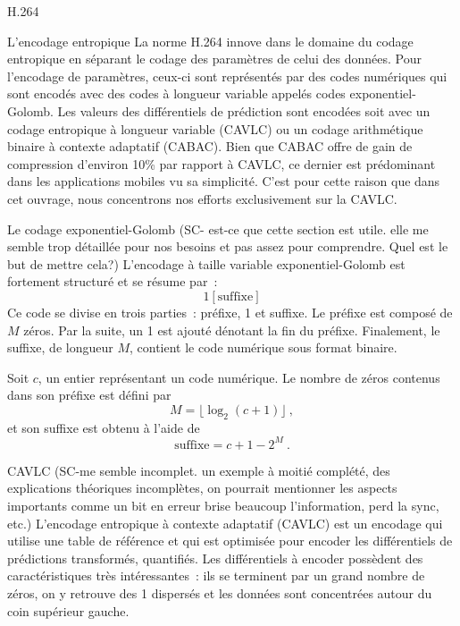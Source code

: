 \documentclass{article}
\begin{document}
\begin{section}{H.264}
\begin{subsection}{L'encodage entropique}
La norme H.264 innove dans le domaine du codage entropique en séparant le codage
des paramètres de celui des données. Pour l'encodage de paramètres, ceux-ci sont
représentés par des codes numériques qui sont encodés avec des codes à longueur
variable appelés codes exponentiel-Golomb. Les valeurs des différentiels de
prédiction sont encodées soit avec un codage entropique à longueur variable
(CAVLC) ou un codage arithmétique binaire à contexte adaptatif (CABAC). Bien que
CABAC offre de gain de compression d'environ 10\% par rapport à CAVLC, ce
dernier est prédominant dans les applications mobiles vu sa simplicité. C'est
pour cette raison que dans cet ouvrage, nous concentrons nos efforts
exclusivement sur la CAVLC.

\begin{subsubsection}{Le codage exponentiel-Golomb} (SC- est-ce que cette section est utile. elle me semble trop détaillée pour nos besoins et pas assez pour comprendre. Quel est le but de mettre cela?)
L'encodage à taille variable exponentiel-Golomb est fortement structuré et
se résume par~:
\begin{equation}
[M~\text{zéros}]1[\text{suffixe}]
\end{equation}
Ce code se divise en trois parties~: préfixe, 1 et suffixe. Le préfixe
est composé de $M$ zéros. Par la suite, un 1 est ajouté dénotant la fin du
préfixe. Finalement, le suffixe, de longueur $M$, contient le code numérique
sous format binaire.

Soit $c$, un entier représentant un code numérique. Le nombre de zéros contenus
dans son préfixe est défini par
\begin{equation}
M = \lfloor \log_2(c+1) \rfloor \:,
\end{equation}
et son suffixe est obtenu à l'aide de 
\begin{equation}
\text{suffixe} = c + 1 - 2^M \:.
\end{equation}
\end{subsubsection}

\begin{subsubsection}{CAVLC} (SC-me semble incomplet. un exemple à moitié complété, des explications théoriques incomplètes, on pourrait mentionner les aspects importants comme un bit en erreur brise beaucoup l'information, perd la sync, etc.)
L'encodage entropique à contexte adaptatif (CAVLC) est un encodage qui utilise
une table de référence et qui est optimisée pour encoder les différentiels de
prédictions transformés, quantifiés. Les différentiels à encoder possèdent des caractéristiques
très intéressantes~: ils se terminent par un grand nombre de zéros, on y
retrouve des 1 dispersés et les données sont concentrées autour du coin
supérieur gauche.


\end{subsubsection}
\end{subsection}
\end{section}
\end{document}
